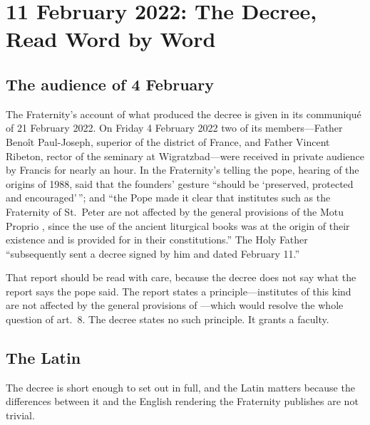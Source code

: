 \section{11 February 2022: The Decree, Read Word by Word}

\subsection{The audience of 4 February}

The Fraternity's account of what produced the decree is given in its
communiqué of 21 February 2022. On Friday 4 February 2022 two of its
members---Father Benoît Paul-Joseph, superior of the district of France,
and Father Vincent Ribeton, rector of the seminary at Wigratzbad---were
received in private audience by Francis for nearly an hour. In the
Fraternity's telling the pope, hearing of the origins of 1988, said that
the founders' gesture ``should be `preserved, protected and
encouraged'\,''; and ``the Pope made it clear that institutes such as the
Fraternity of St.\ Peter are not affected by the general provisions of the
Motu Proprio , since the use of the ancient
liturgical books was at the origin of their existence and is provided for
in their constitutions.'' The Holy Father ``subsequently sent a decree
signed by him and dated February 11.''

That report should be read with care, because the decree does not say
what the report says the pope said. The report states a
principle---institutes of this kind are not affected by the general
provisions of ---which would resolve the whole
question of art.~8. The decree states no such principle. It grants a
faculty.

\subsection{The Latin}

The decree is short enough to set out in full, and the Latin matters
because the differences between it and the English rendering the
Fraternity publishes are not trivial.


